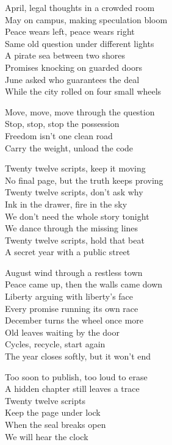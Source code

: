 \begin{lyrics}
April, legal thoughts in a crowded room\\
May on campus, making speculation bloom\\
Peace wears left, peace wears right\\
Same old question under different lights\\
A pirate sea between two shores\\
Promises knocking on guarded doors\\
June asked who guarantees the deal\\
While the city rolled on four small wheels

Move, move, move through the question\\
Stop, stop, stop the possession\\
Freedom isn't one clean road\\
Carry the weight, unload the code

Twenty twelve scripts, keep it moving\\
No final page, but the truth keeps proving\\
Twenty twelve scripts, don't ask why\\
Ink in the drawer, fire in the sky\\
We don't need the whole story tonight\\
We dance through the missing lines\\
Twenty twelve scripts, hold that beat\\
A secret year with a public street

August wind through a restless town\\
Peace came up, then the walls came down\\
Liberty arguing with liberty's face\\
Every promise running its own race\\
December turns the wheel once more\\
Old leaves waiting by the door\\
Cycles, recycle, start again\\
The year closes softly, but it won't end

Too soon to publish, too loud to erase\\
A hidden chapter still leaves a trace\\
Twenty twelve scripts\\
Keep the page under lock\\
When the seal breaks open\\
We will hear the clock
\end{lyrics}

